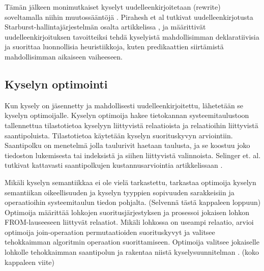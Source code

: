 \documentclass[finnish]{tktltiki2}
\theoremstyle{definition}
\theoremstyle{remark}
\begin{document}
Tämän jälkeen monimutkaiset kyselyt uudelleenkirjoitetaan (rewrite) soveltamalla niihin muutossääntöjä \cite{ioannidis1996query}. Pirahesh et al tutkivat uudelleenkirjotusta Starburst-hallintajärjestelmän osalta artikkelissa \cite{pirahesh1992extensible}, ja määrittivät uudelleenkirjoituksen tavoitteiksi tehdä kyselyistä mahdollisimman deklaratiivisia ja suorittaa luonnollisia heuristiikkoja, kuten predikaattien siirtämistä mahdollisimman aikaiseen vaiheeseen.


\subsection{Kyselyn optimointi}
Kun kysely on jäsennetty ja mahdollisesti uudelleenkirjoitettu, lähetetään se kyselyn optimoijalle. Kyselyn optimoija hakee tietokannan systeemitaulustoon tallennettua tilastotietoa kyselyyn liittyvistä relaatioista ja relaatioihin liittyvistä saantipoluista. Tilastotietoa käytetään kyselyn suorituskyvyn arviointiin. Saantipolku on menetelmä jolla taulurivit haetaan taulusta, ja se koostuu joko tiedoston lukemisesta tai indeksistä ja siihen liittyvistä valinnoista. Selinger et. al. tutkivat kattavasti saantipolkujen kustannusarviointia artikkelissaan \cite{selinger1979access}. 

Mikäli kyselyn semantiikkaa ei ole vielä tarkastettu, tarkastaa optimoija kyselyn semantiikan oikeellisuuden ja kyselyn tyyppien sopivuuden sarakkeisiin ja operaatioihin systeemitaulun tiedon pohjalta. (Selvennä tästä kappaleen loppuun) Optimoija määrittää lohkojen suoritusjärjestyksen ja prosessoi jokaisen lohkon FROM-lauseeseen liittyvät relaatiot. Mikäli lohkossa on useampi relaatio, arvioi optimoija join-operaation permutaatioiden suorituskyvyt ja valitsee tehokkaimman algoritmin operaation suorittamiseen. Optimoija valitsee jokaiselle lohkolle tehokkaimman saantipolun ja rakentaa niistä kyselysuunnitelman \cite{selinger1979access}. (koko kappaleen viite)
\end{document}
